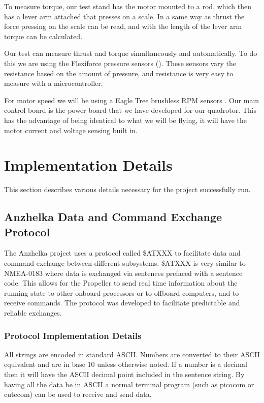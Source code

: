 \documentclass{article}
\numberwithin{equation}{section} %
\begin{document}
To measure torque, our test stand has the motor mounted to a rod, which then has a lever arm attached that presses on a scale. In a same way as thrust the force pressing on the scale can be read, and with the length of the lever arm torque can be calculated.

Our test can measure thrust and torque simultaneously and automatically. To do this we are using the Flexiforce pressure sensors (\cite{tekscanforce}). These sensors vary the resistance based on the amount of pressure, and resistance is very easy to measure with a microcontroller.

For motor speed we will be using a Eagle Tree brushless RPM sensors \cite{eaglerpm}. Our main control board is the power board that we have developed for our quadrotor. This has the advantage of being identical to what we will be flying, it will have the motor current and voltage sensing built in.



\section{Implementation Details}
This section describes various details necessary for the project successfully run.

\subsection{Anzhelka Data and Command Exchange Protocol} \label{subsec:anzhelkadataandcommandexchangeprotocol}

The Anzhelka project uses a protocol called \$ATXXX to facilitate data and command exchange between different subsystems. \$ATXXX is very similar to NMEA-0183 where data is exchanged via sentences prefaced with a sentence code. This allows for the Propeller to send real time information about the running state to other onboard processors or to offboard computers, and to receive commands. The protocol was developed to facilitate predictable and reliable exchanges.

\subsubsection{Protocol Implementation Details}
All strings are encoded in standard ASCII. Numbers are converted to their ASCII equivalent and are in base 10 unless otherwise noted. If a number is a decimal then it will have the ASCII decimal point included in the sentence string. By having all the data be in ASCII a normal terminal program (such as picocom or cutecom) can be used to receive and send data. 
\end{document}
